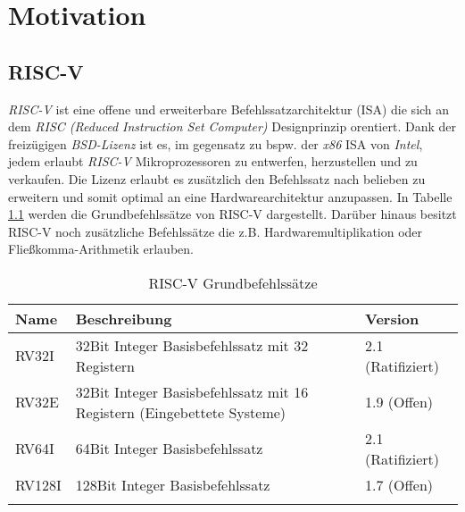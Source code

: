 \chapter{Motivation}

    \section{RISC-V}
        \textit{RISC-V} ist eine offene und erweiterbare Befehlssatzarchitektur (ISA) die sich an dem
        \textit{RISC (Reduced Instruction Set Computer)} Designprinzip orentiert.
        Dank der freizügigen \textit{BSD-Lizenz} ist es, im gegensatz zu bspw. der \textit{x86} ISA von \textit{Intel},
        jedem erlaubt \textit{RISC-V} Mikroprozessoren zu entwerfen, herzustellen und zu verkaufen.
        Die Lizenz erlaubt es zusätzlich den Befehlssatz nach belieben zu erweitern und somit
        optimal an eine Hardwarearchitektur anzupassen.
        In Tabelle \ref{label:riscv-base} werden die Grundbefehlssätze von RISC-V dargestellt.
        Darüber hinaus besitzt RISC-V noch zusätzliche Befehlssätze die z.B. Hardwaremultiplikation
        oder Fließkomma-Arithmetik erlauben. \cite{riscv-isa-specs}
        
        \begin{center}
            \begin{longtable}{| l | l | l |}
                \hline
                    Name & Beschreibung & Version \\
                \hline
                    RV32I & 32Bit Integer Basisbefehlssatz mit 32 Registern & 2.1 (Ratifiziert)\\
                \hline
                    RV32E & 32Bit Integer Basisbefehlssatz mit 16 Registern (Eingebettete Systeme) & 1.9 (Offen)\\
                \hline
                    RV64I & 64Bit Integer Basisbefehlssatz & 2.1 (Ratifiziert)\\
                \hline
                    RV128I & 128Bit Integer Basisbefehlssatz & 1.7 (Offen)\\
                \hline
                \caption{RISC-V Grundbefehlssätze}
                \label{label:riscv-base}
            \end{longtable}
        \end{center}

